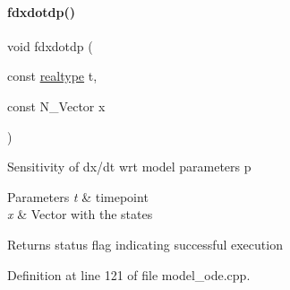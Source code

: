 \paragraph{\texorpdfstring{fdxdotdp()}{fdxdotdp()}\hspace{0.1cm}{\footnotesize\ttfamily [1/3]}}
{\footnotesize\ttfamily void fdxdotdp (\begin{DoxyParamCaption}\item[{const \mbox{\hyperlink{namespaceamici_a1bdce28051d6a53868f7ccbf5f2c14a3}{realtype}}}]{t,  }\item[{const N\+\_\+\+Vector}]{x }\end{DoxyParamCaption})}

Sensitivity of dx/dt wrt model parameters p 
\begin{DoxyParams}{Parameters}
{\em t} & timepoint \\
\hline
{\em x} & Vector with the states \\
\hline
\end{DoxyParams}
\begin{DoxyReturn}{Returns}
status flag indicating successful execution 
\end{DoxyReturn}


Definition at line 121 of file model\+\_\+ode.\+cpp.

